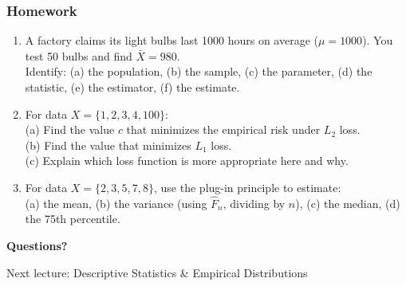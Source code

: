 \documentclass[aspectratio=169]{beamer}
\begin{document}
\begin{frame}
\frametitle{Homework}
\begin{enumerate}
  \item A factory claims its light bulbs last 1000 hours on average ($\mu = 1000$).
    You test 50 bulbs and find $\bar{X} = 980$.\\
    Identify: (a) the population, (b) the sample, (c) the parameter,
    (d) the statistic, (e) the estimator, (f) the estimate.

  \vspace{0.15cm}
  \item For data $X = \{1, 2, 3, 4, 100\}$:\\
    (a) Find the value $c$ that minimizes the empirical risk under $L_2$ loss.\\
    (b) Find the value that minimizes $L_1$ loss.\\
    (c) Explain which loss function is more appropriate here and why.

  \vspace{0.15cm}
  \item For data $X = \{2, 3, 5, 7, 8\}$, use the plug-in principle to estimate:\\
    (a) the mean, (b) the variance (using $\hat{F}_n$, dividing by $n$),
    (c) the median, (d) the 75th percentile.
\end{enumerate}
\end{frame}

\begin{frame}
\begin{center}
  {\Huge\bfseries\textcolor{popblue}{Questions?}}

  \vspace{1cm}

  {\large Next lecture: Descriptive Statistics \& Empirical Distributions}
\end{center}
\end{frame}
\end{document}
